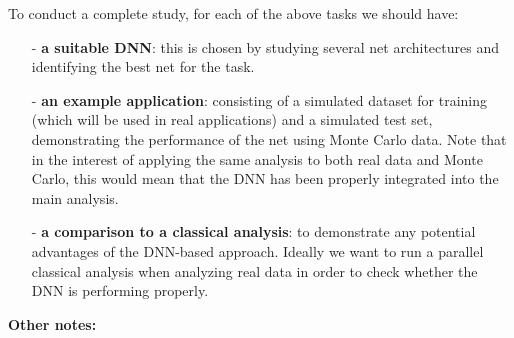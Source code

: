 \documentclass[a4paper,11pt]{article}
\begin{document}
\noindent To conduct a complete study, for each of the above tasks we should have: 

\begin{enumerate}
	\item[-] \textbf{a suitable DNN}: this is chosen by studying several net architectures and identifying the best net for the task.
	\item[-] \textbf{an example application}: consisting of a simulated dataset for training (which will be used in real applications) and a simulated test set, demonstrating the performance of the net using Monte Carlo data. Note that in the interest of applying the same analysis to both real data and Monte Carlo, this would mean that the DNN has been properly integrated into the main analysis.
	\item[-] \textbf{a comparison to a classical analysis}: to demonstrate any potential advantages of the DNN-based approach.  Ideally we want to run a parallel classical analysis when analyzing real data in order to check whether the DNN is performing properly. 
\end{enumerate}

\noindent\textbf{Other notes:}
\end{document}
